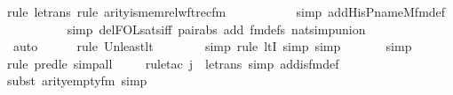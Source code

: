 \begin{isabellebody}
{\isacharparenleft}{\kern0pt}rule\ le{\isacharunderscore}{\kern0pt}trans{\isacharcomma}{\kern0pt}\ rule\ arity{\isacharunderscore}{\kern0pt}is{\isacharunderscore}{\kern0pt}memrel{\isacharunderscore}{\kern0pt}wftrec{\isacharunderscore}{\kern0pt}fm{\isacharparenright}{\kern0pt}\isanewline
\ \ \ \ \ \ \ \ \ \ \isamarkupfalse%
{\isacharparenleft}{\kern0pt}simp\ add{\isacharcolon}{\kern0pt}His{\isacharunderscore}{\kern0pt}P{\isacharunderscore}{\kern0pt}name{\isacharunderscore}{\kern0pt}M{\isacharunderscore}{\kern0pt}fm{\isacharunderscore}{\kern0pt}def{\isacharparenright}{\kern0pt}{\isacharplus}{\kern0pt}\isanewline
\ \ \ \ \ \ \ \ \ \isamarkupfalse%
{\isacharparenleft}{\kern0pt}simp\ del{\isacharcolon}{\kern0pt}FOL{\isacharunderscore}{\kern0pt}sats{\isacharunderscore}{\kern0pt}iff\ pair{\isacharunderscore}{\kern0pt}abs\ add{\isacharcolon}{\kern0pt}\ fm{\isacharunderscore}{\kern0pt}defs\ nat{\isacharunderscore}{\kern0pt}simp{\isacharunderscore}{\kern0pt}union{\isacharparenright}{\kern0pt}\ \isanewline
\ \ \ \ \ \ \ \ \isamarkupfalse%
\ auto{\isacharbrackleft}{\kern0pt}{}{\isacharbrackright}{\kern0pt}\isanewline
\ \ \ \ \ \isamarkupfalse%
{\isacharparenleft}{\kern0pt}rule\ Un{\isacharunderscore}{\kern0pt}least{\isacharunderscore}{\kern0pt}lt{\isacharparenright}{\kern0pt}{\isacharplus}{\kern0pt}\isanewline
\ \ \ \ \ \ \ \isamarkupfalse%
{\isacharparenleft}{\kern0pt}simp{\isacharcomma}{\kern0pt}\ rule\ ltI{\isacharcomma}{\kern0pt}\ simp{\isacharcomma}{\kern0pt}\ simp{\isacharparenright}{\kern0pt}{\isacharplus}{\kern0pt}\isanewline
\ \ \ \ \ \isamarkupfalse%
\ simp\isanewline
\ \ \ \ \isamarkupfalse%
{\isacharparenleft}{\kern0pt}rule\ pred{\isacharunderscore}{\kern0pt}le{\isacharcomma}{\kern0pt}\ simp{\isacharunderscore}{\kern0pt}all{\isacharparenright}{\kern0pt}\isanewline
\ \ \ \ \isamarkupfalse%
{\isacharparenleft}{\kern0pt}rule{\isacharunderscore}{\kern0pt}tac\ j{\isacharequal}{\kern0pt}{}\ \ le{\isacharunderscore}{\kern0pt}trans{\isacharcomma}{\kern0pt}\ simp\ add{\isacharcolon}{\kern0pt}is{\isacharunderscore}{\kern0pt}{}{\isacharunderscore}{\kern0pt}fm{\isacharunderscore}{\kern0pt}def{\isacharparenright}{\kern0pt}\isanewline
\ \ \ \ \ \isamarkupfalse%
{\isacharparenleft}{\kern0pt}subst\ arity{\isacharunderscore}{\kern0pt}empty{\isacharunderscore}{\kern0pt}fm{\isacharcomma}{\kern0pt}\ simp{\isacharparenright}{\kern0pt}\isanewline
\ \ \ \ \ \isamarkupfalse%

\end{isabellebody}
